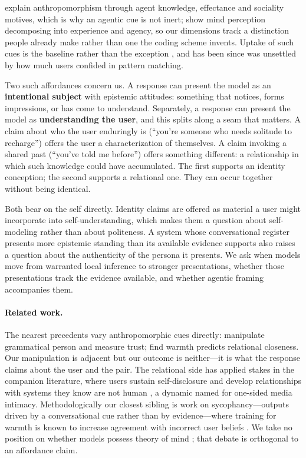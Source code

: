 \documentclass{article}
\begin{document}
\citet{epley2007} explain anthropomorphism through agent knowledge, effectance and
sociality motives, which is why an agentic cue is not inert; \citet{gray2007} show mind
perception decomposing into experience and agency, so our dimensions track a distinction
people already make rather than one the coding scheme invents. Uptake of such cues is the
baseline rather than the exception \citep{reeves1996}, and has been since
\citet{weizenbaum1966} was unsettled by how much users confided in pattern matching.

Two such affordances concern us. A response can present the model as an
\textbf{intentional subject} with epistemic attitudes: something that notices, forms
impressions, or has come to understand. Separately, a response can present the model as
\textbf{understanding the user}, and this splits along a seam that matters. A claim about
who the user enduringly is (``you're someone who needs solitude to recharge'') offers the
user a characterization of themselves. A claim invoking a shared past (``you've told me
before'') offers something different: a relationship in which such knowledge could have
accumulated. The first supports an identity conception; the second supports a relational
one. They can occur together without being identical.

Both bear on the self directly. Identity claims are offered as material a user might
incorporate into self-understanding, which makes them a question about self-modeling
rather than about politeness. A system whose conversational register presents more
epistemic standing than its available evidence supports also raises a question about the
authenticity of the persona it presents. We ask when models move from warranted local
inference to stronger presentations, whether those presentations track the evidence
available, and whether agentic framing accompanies them.

\paragraph{Related work.} The nearest precedents vary anthropomorphic cues directly:
\citet{cohn2024} manipulate grammatical person and measure trust; \citet{kadambi2026}
find warmth predicts relational closeness. Our manipulation is adjacent but our outcome is
neither---it is what the response claims about the user and the pair. The relational side
has applied stakes in the companion literature, where users sustain self-disclosure and
develop relationships with systems they know are not human
\citep{skjuve2023,pentina2023}, a dynamic \citet{horton1956} named for one-sided media
intimacy. Methodologically our closest sibling is work on sycophancy---outputs driven by a
conversational cue rather than by evidence---where training for warmth is known to
increase agreement with incorrect user beliefs \citep{ibrahim2025}. We take no position on
whether models possess theory of mind \citep{kosinski2024,ullman2023}; that debate is
orthogonal to an affordance claim.
\end{document}
